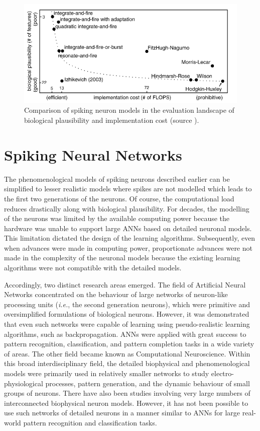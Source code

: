 \begin{figure}
	\centering
	\includegraphics[scale=0.8]{fig/snn/izhikevich.PNG}
	\caption{Comparison of spiking neuron models in the evaluation landscape of biological plausibility and implementation cost (source \citet{izhikevich2004model}).}
	\label{fig:izhikevich}
\end{figure}


\section{Spiking Neural Networks}

The phenomenological models of spiking neurons described earlier can be simplified to lesser realistic models where spikes are not modelled which leads to the first two generations of the neurons. Of course, the computational load reduces drastically along with biological plausibility. For decades, the modelling of the neurons was limited by the available computing power because the hardware was unable to support large ANNs based on detailed neuronal models. This limitation dictated the design of the learning algorithms. Subsequently, even when advances were made in computing power, proportionate advances were not made in the complexity of the neuronal models because the existing learning algorithms were not compatible with the detailed models. 

Accordingly, two distinct research areas emerged. The field of Artificial Neural Networks concentrated on the behaviour of large networks of neuron-like processing units (\emph{i.e.}, the second generation neurons), which were primitive and oversimplified formulations of biological neurons. However, it was demonstrated that even such networks were capable of learning using pseudo-realistic learning algorithms, such as backpropagation. ANNs were applied with great success to pattern recognition, classification, and pattern completion tasks in a wide variety of areas. The other field became known as Computational Neuroscience. Within this broad interdisciplinary field, the detailed biophysical and phenomenological models were primarily used in relatively smaller networks to study electro-physiological processes, pattern generation, and the dynamic behaviour of small groups of neurons. There have also been studies involving very large numbers of interconnected biophysical neuron models. However, it has not been possible to use such networks of detailed neurons in a manner similar to ANNs for large real-world pattern recognition and classification tasks. 

